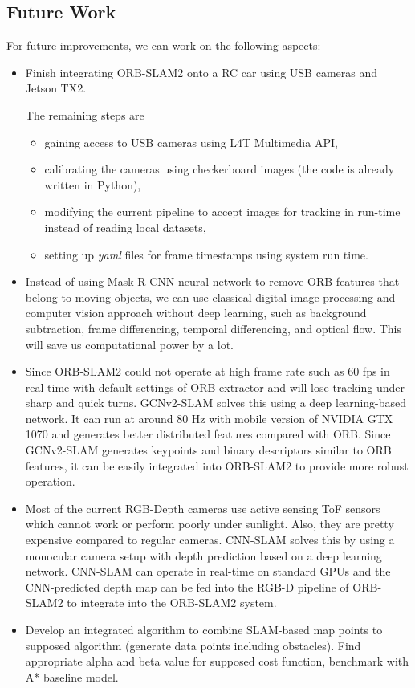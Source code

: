 \documentclass[letterpaper, 10 pt, conference]{IEEEtran}
\begin{document}
\subsection{Future Work} \label{sect:\thesubsection}
For future improvements, we can work on the following aspects: 
\begin{itemize}
    \item Finish integrating ORB-SLAM2 onto a RC car using USB cameras and
    Jetson TX2. 
    
    The remaining steps are 
    \begin{itemize}
        \item gaining access to USB cameras using L4T Multimedia API,
        \item calibrating the cameras using checkerboard images (the code is
        already written in Python),
        \item modifying the current pipeline to accept images for tracking in
        run-time instead of reading local datasets,
        \item setting up \textit{yaml} files for frame timestamps using system
        run time. 
    \end{itemize}
    \item Instead of using Mask R-CNN neural network to remove ORB features that
    belong to moving objects, we can use classical digital image processing and
    computer vision approach without deep learning, such as background
    subtraction, frame differencing, temporal differencing, and optical flow.
    This will save us computational power by a lot. 
    \item Since ORB-SLAM2 could not operate at high frame rate such as 60 fps
    in real-time with default settings of ORB extractor and will lose tracking
    under sharp and quick turns. GCNv2-SLAM \cite{c19} solves this using a deep
    learning-based network. It can run at around 80 Hz with mobile version of
    NVIDIA GTX 1070 and generates better distributed features compared with ORB.
    Since GCNv2-SLAM generates keypoints and binary descriptors similar to ORB
    features, it can be easily integrated into ORB-SLAM2 to provide more robust
    operation. 
    \item Most of the current RGB-Depth cameras use active sensing ToF sensors
    which cannot work or perform poorly under sunlight. Also, they are pretty
    expensive compared to regular cameras. CNN-SLAM \cite{c20} solves this by
    using a monocular camera setup with depth prediction based on a deep
    learning network. CNN-SLAM can operate in real-time on standard GPUs and the
    CNN-predicted depth map can be fed into the RGB-D pipeline of ORB-SLAM2 to
    integrate into the ORB-SLAM2 system. 
    \item Develop an integrated algorithm to combine SLAM-based map points to supposed algorithm (generate data points including obstacles). Find appropriate alpha and beta value for supposed cost function, benchmark with A* baseline model.
\end{itemize}



\end{document}
